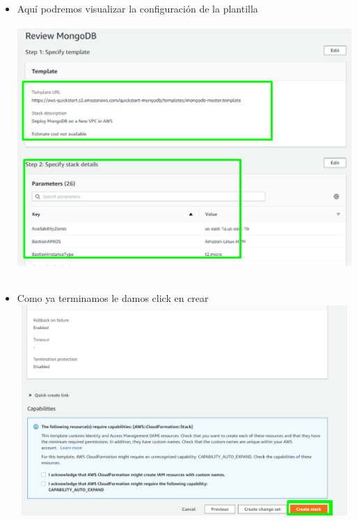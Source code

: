 \documentclass[12pt,a4paper,oneside]{book}
\begin{document}
\newpage
\begin{itemize}
	\item {Aquí podremos visualizar la configuración de la plantilla}\\
	
	\includegraphics[width=16cm, height=10cm]{img/16.png}\\
	
	\item {Como ya terminamos le damos click en crear}\\
	
	\includegraphics[width=16cm, height=8cm]{img/17.png}\\
	
	
	
\end{itemize}
\end{document}
